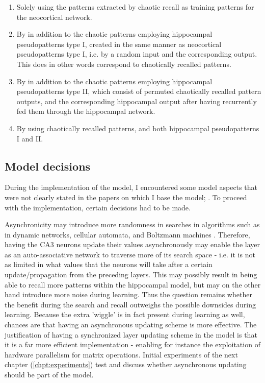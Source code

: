\begin{enumerate}
    \item Solely using the patterns extracted by chaotic recall as training patterns for the neocortical network.
    \item By in addition to the chaotic patterns employing hippocampal pseudopatterns type I, created in the same manner as neocortical pseudopatterns type I, i.e. by a random input and the corresponding output. This does in other words correspond to chaotically recalled patterns.
    \item By in addition to the chaotic patterns employing hippocampal pseudopatterns type II, which consist of permuted chaotically recalled pattern outputs, and the corresponding hippocampal output after having recurrently fed them through the hippocampal network.
    \item By using chaotically recalled patterns, and both hippocampal pseudopatterns I and II.
\end{enumerate}


\subsection{Model decisions}

During the implementation of the model, I encountered some model aspects that were not clearly stated in the papers on which I base the model; \citep{Hattori2014, Hattori2010}. To proceed with the implementation, certain decisions had to be made.

Asynchronicity may introduce more randomness in searches in algorithms such as in dynamic networks, cellular automata, and Boltzmann machines \citep{Bar-yam1997}. Therefore, having the CA3 neurons update their values asynchronously may enable the layer as an auto-associative network to traverse more of its search space - i.e. it is not as limited in what values that the neurons will take after a certain update/propagation from the preceding layers. This may possibly result in being able to recall more patterns within the hippocampal model, but may on the other hand introduce more noise during learning. Thus the question remains whether the benefit during the search and recall outweighs the possible downsides during learning. Because the extra 'wiggle' is in fact present during learning as well, chances are that having an asynchronous updating scheme is more effective.
The justification of having a synchronized layer updating scheme in the model is that it is a far more efficient implementation - enabling for instance the exploitation of hardware parallelism for matrix operations. Initial experiments of the next chapter (\ref{chpt:experiments}) test and discuss whether asynchronous updating should be part of the model.
\\

